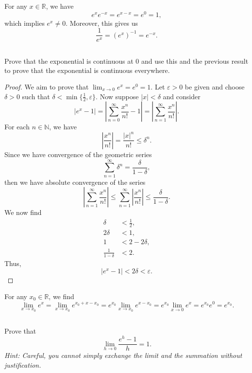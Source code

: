 \documentclass[12pt]{article}
\newenvironment{problem}
    {\begin{lrbox}{\mybox}\begin{minipage}{0.98\textwidth}}
    {\end{minipage}\end{lrbox}\begin{center}\framebox[\textwidth]{\usebox{\mybox}}\end{center}}
\theoremstyle{definition}
\newcommand{\ds}{\displaystyle}
\newcommand{\N}{\mathbb{N}}
\newcommand{\R}{\mathbb{R}}
\newcommand{\eps}{\varepsilon}
\begin{document}
For any $x \in \R$, we have
\[
    e^xe^{-x} = e^{x-x} = e^0 = 1,
\]
which implies $e^x \ne 0$. Moreover, this gives us
\[
    \frac{1}{e^x} = (e^x)^{-1} = e^{-x}.
\]

\newpage
\subsection{}
\begin{problem}
    Prove that the exponential is continuous at $0$ and use this and the previous result to prove that the exponential is continuous everywhere.
\end{problem}

\begin{proof}
    We aim to prove that $\ds\lim_{x \to 0} e^x = e^0 = 1$. Let $\eps > 0$ be given and choose $\delta > 0$ such that $\delta < \min\{\frac12, \eps\}$. Now suppose $|x| < \delta$ and consider
    \[
        |e^x - 1| 
            = \left|\sum_{n=0}^\infty \frac{x^n}{n!} - 1\right| 
            = \left|\sum_{n=1}^\infty \frac{x^n}{n!}\right|.
    \]
    For each $n \in \N$, we have
    \[
        \left|\frac{x^n}{n!}\right| = \frac{|x|^n}{n!} \leq \delta^n.
    \]
    Since we have convergence of the geometric series
    \[
        \sum_{n=1}^\infty \delta^n = \frac{\delta}{1 - \delta},
    \]
    then we have absolute convergence of the series
    \[
        \left|\sum_{n=1}^\infty \frac{x^n}{n!}\right|
         \leq \sum_{n=1}^\infty \left|\frac{x^n}{n!}\right|
         \leq \frac{\delta}{1 - \delta}.
    \]
    We now find
    \begin{align*}
        \delta &< \frac12, \\
        2\delta &< 1, \\
        1 &< 2 - 2\delta, \\
        \frac{1}{1 - \delta} &< 2.
    \end{align*}
    Thus,
    \[
        |e^x - 1| < 2\delta < \eps.
    \]
    
\end{proof}

For any $x_0 \in \R$, we find
\[
    \lim_{x \to x_0} e^x 
        = \lim_{x \to x_0} e^{x_0 + x - x_0}
        = e^{x_0} \lim_{x \to x_0} e^{x-x_0}
        = e^{x_0} \lim_{x \to 0} e^x
        = e^{x_0} e^0
        =e^{x_0}.
\]

\subsection{}
\begin{problem}
    Prove that 
    \begin{equation}
        \lim_{h\to 0} \frac{e^h-1}{h} = 1.
    \end{equation}
    {\it Hint: Careful, you cannot simply exchange the limit and the summation without justification.}
\end{problem}
\end{document}
